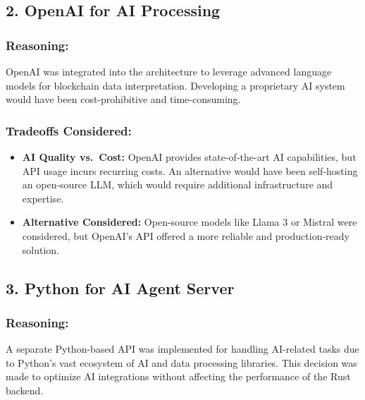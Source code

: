 \documentclass[
]{article}
\providecommand{\tightlist}{%
  \setlength{\itemsep}{0pt}\setlength{\parskip}{0pt}}
\begin{document}
\hypertarget{openai-for-ai-processing}{%
\subsection{2. OpenAI for AI
Processing}\label{openai-for-ai-processing}}

\hypertarget{reasoning-1}{%
\subsubsection{\texorpdfstring{\textbf{Reasoning:}}{Reasoning:}}\label{reasoning-1}}

OpenAI was integrated into the architecture to leverage advanced
language models for blockchain data interpretation. Developing a
proprietary AI system would have been cost-prohibitive and
time-consuming.

\hypertarget{tradeoffs-considered-1}{%
\subsubsection{\texorpdfstring{\textbf{Tradeoffs
Considered:}}{Tradeoffs Considered:}}\label{tradeoffs-considered-1}}

\begin{itemize}
\tightlist
\item
  \textbf{AI Quality vs.~Cost:} OpenAI provides state-of-the-art AI
  capabilities, but API usage incurs recurring costs. An alternative
  would have been self-hosting an open-source LLM, which would require
  additional infrastructure and expertise.
\item
  \textbf{Alternative Considered:} Open-source models like Llama 3 or
  Mistral were considered, but OpenAI's API offered a more reliable and
  production-ready solution.
\end{itemize}

\hypertarget{python-for-ai-agent-server}{%
\subsection{3. Python for AI Agent
Server}\label{python-for-ai-agent-server}}

\hypertarget{reasoning-2}{%
\subsubsection{\texorpdfstring{\textbf{Reasoning:}}{Reasoning:}}\label{reasoning-2}}

A separate Python-based API was implemented for handling AI-related
tasks due to Python's vast ecosystem of AI and data processing
libraries. This decision was made to optimize AI integrations without
affecting the performance of the Rust backend.
\end{document}
